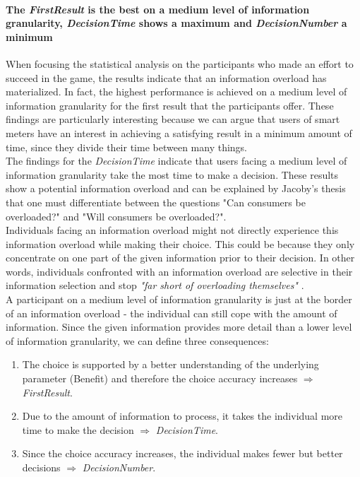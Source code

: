 \paragraph{The \textit{FirstResult} is the best on a medium level of information granularity, \textit{DecisionTime} shows a maximum and \textit{DecisionNumber} a minimum}
When focusing the statistical analysis on the participants who made an effort to succeed in the game, the results indicate that an information overload has materialized. In fact, the highest performance is achieved on a medium level of information granularity for the first result that the participants offer. These findings are particularly interesting because we can argue that users of smart meters have an interest in achieving a satisfying result in a minimum amount of time, since they divide their time between many things.\\
The findings for the \textit{DecisionTime} indicate that users facing a medium level of information granularity take the most time to make a decision. These results show a potential information overload and can be explained by Jacoby's thesis that one must differentiate between the questions "Can consumers be overloaded?" and "Will consumers be overloaded?".\\ 
Individuals facing an information overload might not directly experience this information overload while making their choice. This could be because they only concentrate on one part of the given information prior to their decision. In other words, individuals confronted with an information overload are selective in their information selection and stop \textit{"far short of overloading themselves"} \citep{Jacoby1984}.\\
A participant on a medium level of information granularity is just at the border of an information overload - the individual can still cope with the amount of information. Since the given information provides more detail than a lower level of information granularity, we can define three consequences:
\begin{enumerate}
\item The choice is supported by a better understanding of the underlying parameter (Benefit) and therefore the choice accuracy increases $\Rightarrow$ \textit{FirstResult}.
\item Due to the amount of information to process, it takes the individual more time to make the decision $\Rightarrow$ \textit{DecisionTime}.
\item Since the choice accuracy increases, the individual makes fewer but better decisions $\Rightarrow$ \textit{DecisionNumber}.
\end{enumerate}
